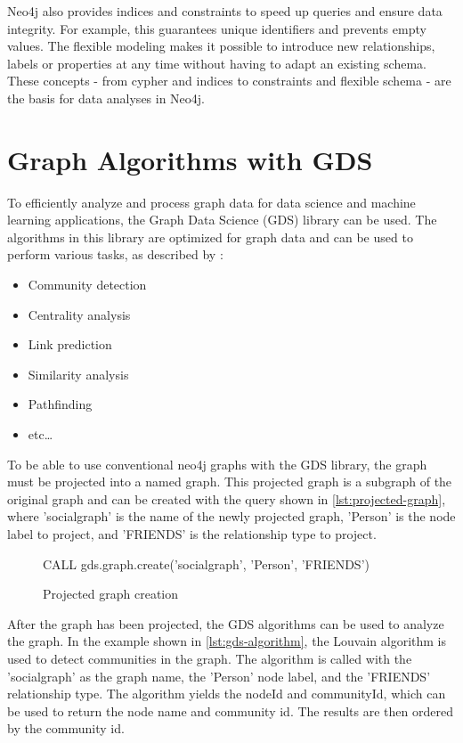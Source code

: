 \documentclass[english,smartquotes,apa]{hgbreport}
\begin{document}
Neo4j also provides indices and constraints to speed up queries and ensure data integrity. For example, this guarantees unique identifiers and prevents empty values. The flexible modeling makes it possible to introduce new relationships, labels or properties at any time without having to adapt an existing schema. These concepts - from cypher and indices to constraints and flexible schema - are the basis for data analyses in Neo4j.



\section*{Graph Algorithms with GDS}

To efficiently analyze and process graph data for data science and machine learning applications, the Graph Data Science (GDS) library can be used. The algorithms in this library are optimized for graph data and can be used to perform various tasks, as described by \cite{neo4j-gds}:

\begin{itemize}
	\item Community detection
	\item Centrality analysis
	\item Link prediction
	\item Similarity analysis
	\item Pathfinding
	\item etc\dots
\end{itemize}

To be able to use conventional neo4j graphs with the GDS library, the graph must be projected into a named graph. This projected graph is a subgraph of the original graph and can be created with the query shown in \autoref{lst:projected-graph}, where 'socialgraph' is the name of the newly projected graph, 'Person' is the node label to project, and 'FRIENDS' is the relationship type to project.

\begin{figure}[h]
	\begin{GenericCode}[numbers=none]
	CALL gds.graph.create('socialgraph', 'Person', 'FRIENDS')
	\end{GenericCode}
	\caption{Projected graph creation}
	\label{lst:projected-graph}
\end{figure}

After the graph has been projected, the GDS algorithms can be used to analyze the graph. In the example shown in \autoref{lst:gds-algorithm}, 
the Louvain algorithm is used to detect communities in the graph. The algorithm is called with the 'socialgraph' as the graph name, the 'Person' node label, and the 'FRIENDS' relationship type. The algorithm yields the nodeId and communityId, which can be used to return the node name and community id. The results are then ordered by the community id.
\end{document}
